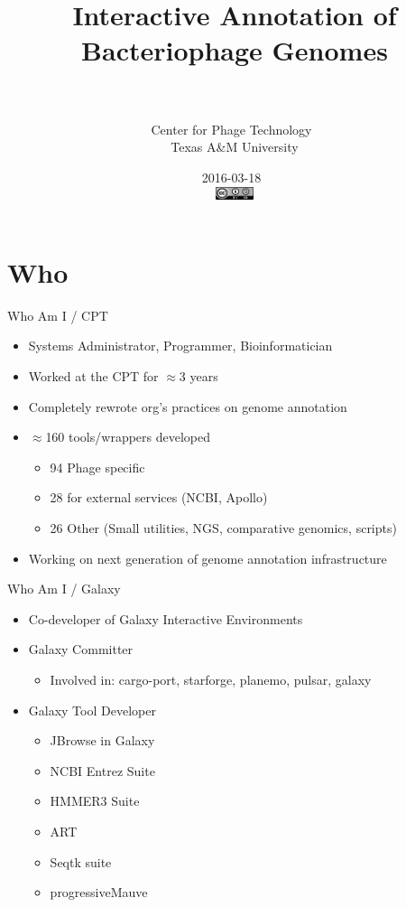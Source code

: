 \documentclass[12pt]{beamer}
\title[Phage Annotation]{Interactive Annotation of Bacteriophage Genomes}
\author[\myName]{\myName\ \\\ \\Center for Phage Technology\ \\Texas A\&M University}
\date{2016-03-18\ \\\includegraphics[width=31pt]{cc-by-sa.png}}
\begin{document}
\frame{\titlepage}

\section{Who}
\begin{frame}{Who Am I / CPT}
    \begin{itemize}
    \item Systems Administrator, Programmer, Bioinformatician
    \item Worked at the CPT for $\approx$3 years
    \item Completely rewrote org's practices on genome annotation
    \item $\approx$160 tools/wrappers developed
        \begin{itemize}
            \item 94 Phage specific
            \item 28 for external services (NCBI, Apollo)
            \item 26 Other (Small utilities, NGS, comparative genomics, scripts)
        \end{itemize}
    \item Working on next generation of genome annotation infrastructure
    \end{itemize}
\end{frame}

\begin{frame}{Who Am I / Galaxy}
    \begin{itemize}
        \item Co-developer of Galaxy Interactive Environments
        \item Galaxy Committer
            \begin{itemize}
                \item Involved in: cargo-port, starforge, planemo, pulsar, galaxy
            \end{itemize}
        \item Galaxy Tool Developer
        \begin{itemize}
            \item JBrowse in Galaxy
            \item NCBI Entrez Suite
            \item HMMER3 Suite
            \item ART
            \item Seqtk suite
            \item progressiveMauve
        \end{itemize}
    \end{itemize}
\end{frame}
\end{document}
